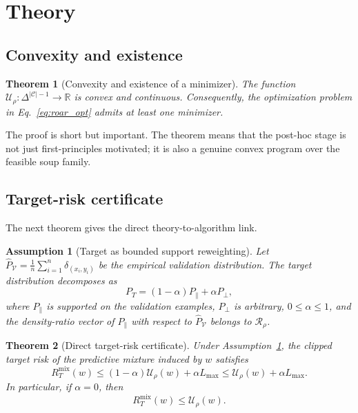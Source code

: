 \documentclass{article}
\newtheorem{theorem}{Theorem}
\newtheorem{assumption}{Assumption}
\newcommand{\RR}{\mathbb{R}}
\newcommand{\cC}{\mathcal{C}}
\newcommand{\cR}{\mathcal{R}}
\newcommand{\cV}{\mathcal{V}}
\newcommand{\simplex}{\Delta}
\begin{document}
\section{Theory}
\label{sec:theory}

\subsection{Convexity and existence}

\begin{theorem}[Convexity and existence of a minimizer]
\label{thm:convexity}
The function $\mathcal U_{\rho}:\simplex^{|\cC|-1}\to \RR$ is convex and continuous. Consequently, the optimization problem in Eq.~\eqref{eq:roar_opt} admits at least one minimizer.
\end{theorem}

The proof is short but important. The theorem means that the post-hoc stage is not just first-principles motivated; it is also a genuine convex program over the feasible soup family.

\subsection{Target-risk certificate}

The next theorem gives the direct theory-to-algorithm link.

\begin{assumption}[Target as bounded support reweighting]
\label{ass:support}
Let $\widehat P_{\cV}=\frac{1}{n}\sum_{i=1}^{n}\delta_{(x_i,y_i)}$ be the empirical validation distribution. The target distribution decomposes as
\[
    P_T = (1-\alpha)P_{\parallel} + \alpha P_{\perp},
\]
where $P_{\parallel}$ is supported on the validation examples, $P_{\perp}$ is arbitrary, $0\le \alpha\le 1$, and the density-ratio vector of $P_{\parallel}$ with respect to $\widehat P_{\cV}$ belongs to $\cR_{\rho}$.
\end{assumption}

\begin{theorem}[Direct target-risk certificate]
\label{thm:certificate}
Under Assumption~\ref{ass:support}, the clipped target risk of the predictive mixture induced by $w$ satisfies
\begin{equation}
    R_T^{\mathrm{mix}}(w)
    \le
    (1-\alpha)\mathcal U_{\rho}(w) + \alpha L_{\max}
    \le
    \mathcal U_{\rho}(w) + \alpha L_{\max}.
    \label{eq:certificate}
\end{equation}
In particular, if $\alpha=0$, then
\[
    R_T^{\mathrm{mix}}(w)\le \mathcal U_{\rho}(w).
\]
\end{theorem}
\end{document}

